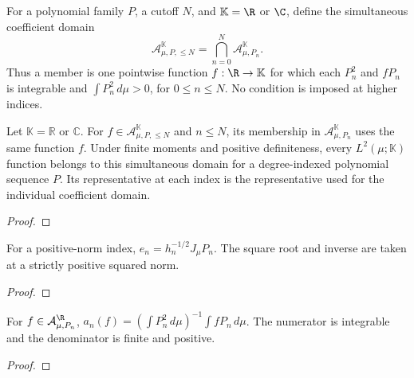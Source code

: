\begin{supporting}
\begin{definition}
\label{def:integral-coefficient-family-input}
\leanok
For a polynomial family $P$, a cutoff $N$, and $\mathbb K=\R$ or $\C$,
define the simultaneous coefficient domain
\[
\mathcal A_{\mu,P,\le N}^{\mathbb K}
 =\bigcap_{n=0}^N\mathcal A_{\mu,P_n}^{\mathbb K}.
\]
Thus a member is one pointwise function $f:\R\to\mathbb K$ for which each
$P_n^2$ and $fP_n$ is integrable and $\int P_n^2\,d\mu>0$, for $0\le n\le N$.
No condition is imposed at higher indices.
\end{definition}

\begin{theorem}
\label{thm:integral-coefficient-family-input}
\leanok
Let $\mathbb K=\mathbb R$ or $\mathbb C$.
For $f\in\mathcal A_{\mu,P,\le N}^{\mathbb K}$ and $n\le N$, its
membership in $\mathcal A_{\mu,P_n}^{\mathbb K}$ uses the same function $f$.
Under finite moments and positive definiteness, every $L^2(\mu;\mathbb K)$
function belongs to this simultaneous domain for a degree-indexed polynomial
sequence $P$. Its representative at each index is the representative used
for the individual coefficient domain.
\end{theorem}
\begin{proof}
\leanok
\end{proof}

\begin{theorem}
\label{thm:general-normalization-characterisation}
\leanok
For a positive-norm index, $e_n=h_n^{-1/2}J_\mu P_n$.
The square root and inverse are taken at a strictly positive squared norm.
\end{theorem}
\begin{proof}
\leanok
\end{proof}

\begin{theorem}
\label{thm:general-coefficient-characterisation}
\leanok
For $f\in\mathcal A_{\mu,P_n}^{\R}$,
$a_n(f)=(\int P_n^2\,d\mu)^{-1}\int fP_n\,d\mu$.
The numerator is integrable and the denominator is finite and positive.
\end{theorem}
\begin{proof}
\leanok
\end{proof}


\end{supporting}
